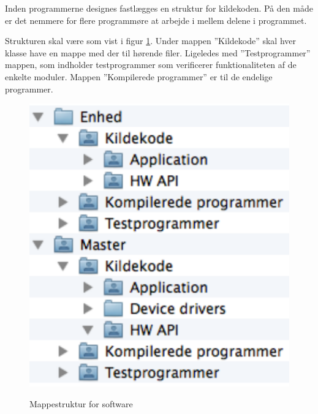 
Inden programmerne designes fastlægges en struktur for kildekoden. På den måde er det nemmere for flere programmøre at arbejde i mellem delene i programmet.

Strukturen skal være som vist i figur \ref{fig:implementationview}. Under mappen ''Kildekode'' skal hver klasse have en mappe med der til hørende filer. Ligeledes med ''Testprogrammer'' mappen, som indholder testprogrammer som verificerer funktionaliteten af de enkelte moduler.
Mappen ''Kompilerede programmer'' er til de endelige programmer.

\begin{figure}[htbp] \centering
{\includegraphics[scale=0.7]{filer/pics/SW-Implementation-View}}
\caption{Mappestruktur for software}
\label{fig:implementationview}
\end{figure}